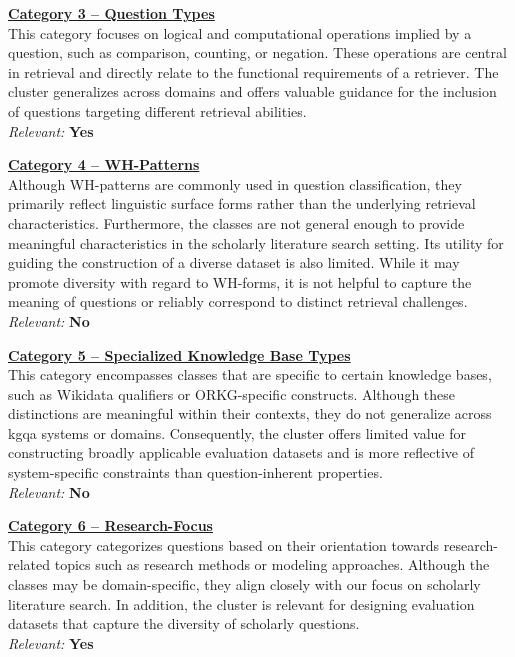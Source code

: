 \hyperref[enum:cluster_3]{\textbf{Category 3 – Question Types}} \\
This category focuses on logical and computational operations implied by a question, such as comparison, counting, or negation. These operations are central in retrieval and directly relate to the functional requirements of a retriever. The cluster generalizes across domains and offers valuable guidance for the inclusion of questions targeting different retrieval abilities. \\
\textit{Relevant:} \textbf{Yes}

\hyperref[enum:cluster_4]{\textbf{Category 4 – WH-Patterns}} \\
Although WH-patterns are commonly used in question classification, they primarily reflect linguistic surface forms rather than the underlying retrieval characteristics. Furthermore, the classes are not general enough to provide meaningful characteristics in the scholarly literature search setting. Its utility for guiding the construction of a diverse dataset is also limited. While it may promote diversity with regard to WH-forms, it is not helpful to capture the meaning of questions or reliably correspond to distinct retrieval challenges. \\
\textit{Relevant:} \textbf{No}

\hyperref[enum:cluster_5]{\textbf{Category 5 – Specialized Knowledge Base Types}} \\
This category encompasses classes that are specific to certain knowledge bases, such as Wikidata qualifiers or ORKG-specific constructs. Although these distinctions are meaningful within their contexts, they do not generalize across \gls{kgqa} systems or domains. Consequently, the cluster offers limited value for constructing broadly applicable evaluation datasets and is more reflective of system-specific constraints than question-inherent properties. \\
\textit{Relevant:} \textbf{No}

\hyperref[enum:cluster_6]{\textbf{Category 6 – Research-Focus}} \\
This category categorizes questions based on their orientation towards research-related topics such as research methods or modeling approaches. Although the classes may be domain-specific, they align closely with our focus on scholarly literature search. In addition, the cluster is relevant for designing evaluation datasets that capture the diversity of scholarly questions. \\
\textit{Relevant:} \textbf{Yes}

